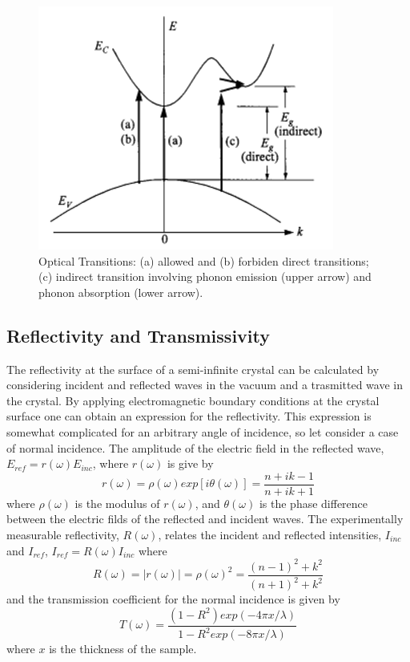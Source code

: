 \documentclass[%
reprint,
amsmath,amssymb,
aps,
]{revtex4-1}
\begin{document}
	\begin{figure}[!h]
		\centering
		\includegraphics[scale=0.8]{transitions.png}
		\caption{Optical Transitions: (a) allowed and (b) forbiden direct transitions; (c) indirect transition involving phonon emission (upper arrow) and phonon absorption (lower arrow)\cite{sze}.
			\label{transitions}}
	\end{figure}
	
	\subsection{Reflectivity and Transmissivity}
	The reflectivity at the surface of a semi-infinite crystal can be calculated by considering incident and reflected waves in the vacuum and a trasmitted wave in the crystal. By applying electromagnetic boundary conditions at the crystal surface one can obtain an expression for the reflectivity. This expression is somewhat complicated for an arbitrary angle of incidence, so let consider a case of normal incidence. The amplitude of the electric field in the reflected wave, $ E_{ref} = r(\omega)E_{inc} $, where $  r(\omega) $ is give by
	\begin{equation}
		r(\omega) =  \rho(\omega) exp[i\theta(\omega)] = \dfrac{n + ik - 1}{n + ik +1}
	\end{equation}
	where $ \rho(\omega)  $ is the modulus of $ r(\omega) $, and $ \theta(\omega) $ is the phase difference between the electric filds of the reflected and incident waves.
	The experimentally measurable reflectivity, $ R(\omega) $, relates the incident and reflected intensities, $ I_{inc} $ and $ I_{ref} $, $ I_{ref}  = R(\omega)I_{inc}$ where
	\begin{equation}
		R(\omega) =|r(\omega)| ={\rho(\omega)}^2  = \dfrac{(n-1)^2 + k^2}{(n+1)^2 + k^2}
		\label{refre}
	\end{equation}
	and the transmission coefficient for the normal incidence is given by
	\begin{equation}
		T(\omega) = \dfrac{(1 - R^2)exp(-4\pi x/ \lambda)}{1 - R^2exp(-8\pi x/ \lambda)}
	\end{equation}
	where $ x $ is the thickness of the sample.
	
\end{document}
